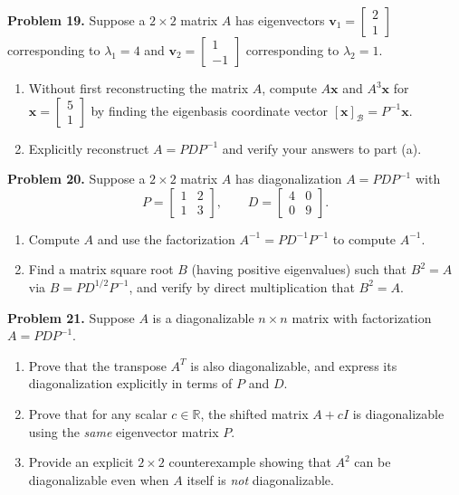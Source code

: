 \documentclass[11pt, letterpaper]{article}
\theoremstyle{definition}
\theoremstyle{remark}
\begin{document}
\textbf{Problem 19.}\label{prob:19}
Suppose a $2 \times 2$ matrix $A$ has eigenvectors $\mathbf{v}_1 = \begin{bmatrix} 2 \\ 1 \end{bmatrix}$ corresponding to $\lambda_1 = 4$ and $\mathbf{v}_2 = \begin{bmatrix} 1 \\ -1 \end{bmatrix}$ corresponding to $\lambda_2 = 1$.
\begin{enumerate}[label=(\alph*)]
    \item Without first reconstructing the matrix $A$, compute $A\mathbf{x}$ and $A^{3}\mathbf{x}$ for $\mathbf{x} = \begin{bmatrix} 5 \\ 1 \end{bmatrix}$ by finding the eigenbasis coordinate vector $[\mathbf{x}]_{\mathcal{B}} = P^{-1}\mathbf{x}$.
    \item Explicitly reconstruct $A = PDP^{-1}$ and verify your answers to part (a).
\end{enumerate}

\textbf{Problem 20.}\label{prob:20}
Suppose a $2 \times 2$ matrix $A$ has diagonalization $A = PDP^{-1}$ with
\[
P = \begin{bmatrix} 1 & 2 \\ 1 & 3 \end{bmatrix}, \qquad D = \begin{bmatrix} 4 & 0 \\ 0 & 9 \end{bmatrix}.
\]
\begin{enumerate}[label=(\alph*)]
    \item Compute $A$ and use the factorization $A^{-1} = PD^{-1}P^{-1}$ to compute $A^{-1}$.
    \item Find a matrix square root $B$ (having positive eigenvalues) such that $B^{2} = A$ via $B = PD^{1/2}P^{-1}$, and verify by direct multiplication that $B^{2} = A$.
\end{enumerate}

\textbf{Problem 21.}\label{prob:21}
Suppose $A$ is a diagonalizable $n \times n$ matrix with factorization $A = PDP^{-1}$.
\begin{enumerate}[label=(\alph*)]
    \item Prove that the transpose $A^{T}$ is also diagonalizable, and express its diagonalization explicitly in terms of $P$ and $D$.
    \item Prove that for any scalar $c \in \mathbb{R}$, the shifted matrix $A + cI$ is diagonalizable using the \emph{same} eigenvector matrix $P$.
    \item Provide an explicit $2 \times 2$ counterexample showing that $A^{2}$ can be diagonalizable even when $A$ itself is \emph{not} diagonalizable.
\end{enumerate}
\end{document}

